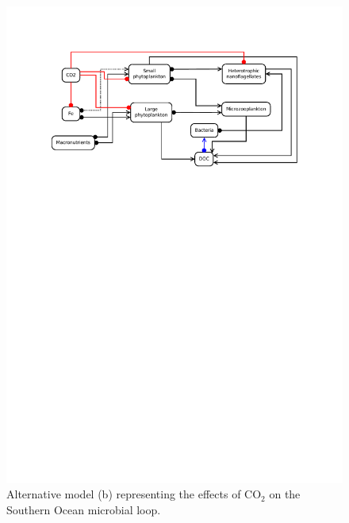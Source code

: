 \documentclass[a4paper]{article}\usepackage[]{graphicx}\usepackage[]{color}
\begin{document}
\begin{figure}[ht]
  \centering
  \includegraphics{Antarctic-b.pdf}
  \caption{Alternative model (b) representing the effects of $\mathrm{CO}_{2}$ on the
  Southern  Ocean microbial loop.}
  \label{fig:Antarctic-b}
\end{figure}
\vspace{1cm}
\end{document}

